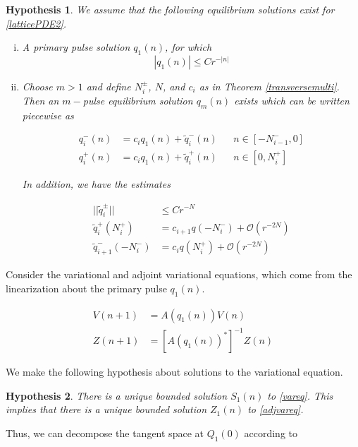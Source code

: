 \documentclass[12pt]{article}
\newtheorem{hypothesis}{Hypothesis}
\begin{document}
\begin{hypothesis}\label{solutionshyp}
We assume that the following equilibrium solutions exist for \eqref{latticePDE2}.
\begin{enumerate}[(i)]
\item A primary pulse solution $q_1(n)$, for which 
\begin{equation}
|q_1(n)| \leq C r^{-|n|}
\end{equation}
\item Choose $m > 1$ and define $N_i^\pm$, $N$, and $c_i$ as in Theorem \ref{transversemulti}. Then an $m-$pulse equilibrium solution $q_m(n)$ exists which can be written piecewise as

\begin{align}
q_i^-(n) &= c_i q_1(n) + \tilde{q}_i^-(n) && n \in [-N_{i-1}^-, 0] \\
q_i^+(n) &= c_i q_1(n) + \tilde{q}_i^+(n) && n \in [0, N_i^+]
\end{align}

In addition, we have the estimates

\begin{align}
||\tilde{q}_i^\pm|| &\leq C r^{-N} \\
\tilde{q}_i^+(N_i^+) &= c_{i+1} q(-N_i^-) + \mathcal{O}(r^{-2N}) \\
\tilde{q}_{i+1}^-(-N_i^-) &= c_i q(N_i^+) + \mathcal{O}(r^{-2N})
\end{align}
\end{enumerate}
\end{hypothesis}

Consider the variational and adjoint variational equations, which come from the linearization about the primary pulse $q_1(n)$.

\begin{align}
V(n+1) &= A(q_1(n)) V(n) \label{vareq} \\
Z(n+1) &= [A(q_1(n))^*]^{-1} Z(n) \label{adjvareq}
\end{align}

We make the following hypothesis about solutions to the variational equation.

\begin{hypothesis}\label{vareqhyp}
There is a unique bounded solution $S_1(n)$ to \eqref{vareq}. This implies that there is a unique bounded solution $Z_1(n)$ to \eqref{adjvareq}.
\end{hypothesis}

Thus, we can decompose the tangent space at $Q_1(0)$ according to
\end{document}

